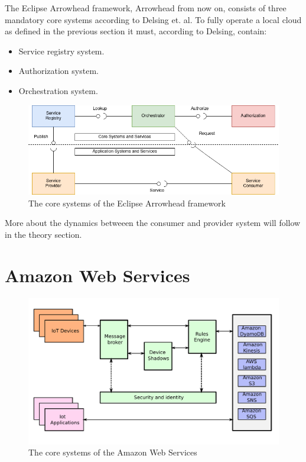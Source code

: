 The Eclipse Arrowhead framework, Arrowhead from now on, consists of three mandatory core systems according to Delsing et. al.
To fully operate a local cloud as defined in the previous section it must, according to Delsing, contain:
\begin{itemize}
    \item Service registry system.
    \item Authorization system. 
    \item Orchestration system.\cite{Delsing2017}
\end{itemize} 

\begin{figure}[H]
    \centering
    \includegraphics[width=\textwidth]{Pictures/arrowheadfulldiagram.png} 
    \caption{The core systems of the Eclipse Arrowhead framework}
    \label{diagram arrowhead}
\end{figure}
More about the dynamics betweeen the consumer and provider system will follow in the theory section.
\section{Amazon Web Services}

\begin{figure}[H]
    \centering
    \includegraphics[width=\textwidth]{Pictures/aws.pdf} 
    \caption{The core systems of the Amazon Web Services}
    \label{diagram AWS}
\end{figure}
